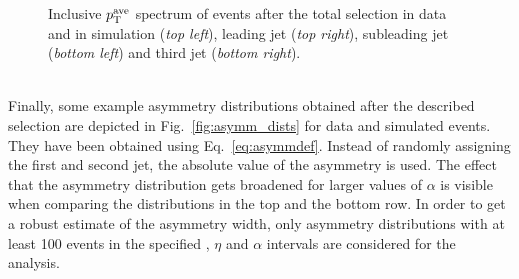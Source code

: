 \begin{figure}[!tp]
\begin{tabular}{cc}
  \end{tabular}
  \caption{Inclusive $p_{\text{T}}^\mathrm{ave}$ spectrum of events after the total selection in data and in simulation (\textit{top left}), leading jet \pt (\textit{top right}), subleading jet \pt (\textit{bottom left}) and third jet \pt (\textit{bottom right}).}
  \label{fig:ptave_spec}
\end{figure}
\\
Finally, some example asymmetry distributions obtained after the described selection are depicted in Fig.~\ref{fig:asymm_dists} for data and simulated events. They have been obtained using Eq.~\ref{eq:asymmdef}. Instead of randomly assigning the first and second jet, the absolute value of the asymmetry is used. The effect that the asymmetry distribution gets broadened for larger values of $\alpha$ is visible when comparing the distributions in the top and the bottom row. In order to get a robust estimate of the asymmetry width, only asymmetry distributions with at least 100 events in the specified \ptave, $\eta$ and $\alpha$ intervals are considered for the analysis. 

